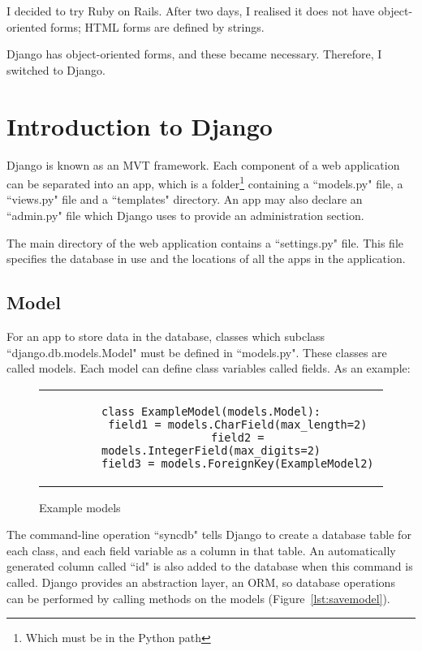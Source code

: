 I decided to try Ruby on Rails. After two days, I realised it does not have object-oriented forms; HTML forms are defined by strings.

Django has object-oriented forms, and these became necessary. Therefore, I switched to Django.

\section{Introduction to Django}
Django is known as an \gls{MVT} framework. Each component of a web application can be separated into an app, which is a folder\footnote{Which must be in the Python path} containing a ``models.py" file, a ``views.py" file and a ``templates" directory. An app may also declare an ``admin.py" file which Django uses to provide an administration section.

The main directory of the web application contains a ``settings.py" file. This file specifies the database in use and the locations of all the apps in the application.

\subsection{Model}
For an app to store data in the database, classes which subclass ``django.db.models.Model" must be defined in ``models.py". These classes are called models. Each model can define class variables called fields. As an example:

\begin{figure}[thp]
	\centering
	\begin{tabular}{c}
	\begin{lstlisting}[label={lst:model}]
	class ExampleModel(models.Model):
		field1 = models.CharField(max_length=2)
		field2 = models.IntegerField(max_digits=2)
		field3 = models.ForeignKey(ExampleModel2)
	\end{lstlisting}
	\end{tabular}
	\caption{Example models}
\end{figure}

The command-line operation ``syncdb" tells Django to create a database table for each class, and each field variable as a column in that table. An automatically generated column called ``id" is also added to the database when this command is called. Django provides an abstraction layer, an \gls{ORM}, so database operations can be performed by calling methods on the models (Figure~\ref{lst:savemodel}).

